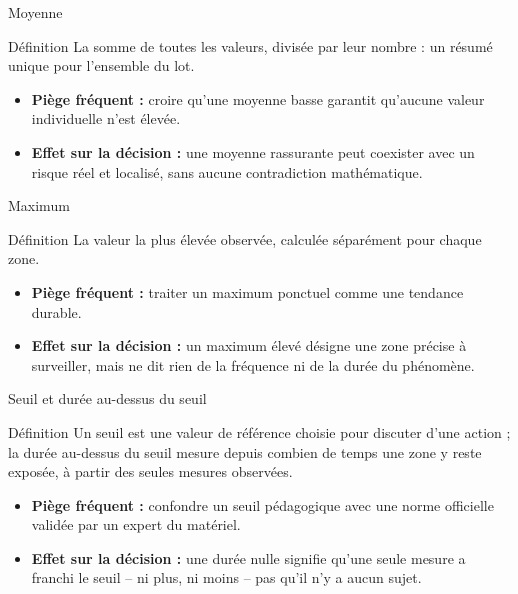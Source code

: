 \documentclass[aspectratio=169]{beamer}
\begin{document}
\begin{frame}{Moyenne}
  \begin{block}{Définition}
    La somme de toutes les valeurs, divisée par leur nombre : un résumé unique pour l'ensemble du lot.
  \end{block}
  \begin{itemize}
    \item \textbf{Piège fréquent :} croire qu'une moyenne basse garantit qu'aucune valeur individuelle n'est élevée.
    \item \textbf{Effet sur la décision :} une moyenne rassurante peut coexister avec un risque réel et localisé, sans aucune contradiction mathématique.
  \end{itemize}
\end{frame}

\begin{frame}{Maximum}
  \begin{block}{Définition}
    La valeur la plus élevée observée, calculée séparément pour chaque zone.
  \end{block}
  \begin{itemize}
    \item \textbf{Piège fréquent :} traiter un maximum ponctuel comme une tendance durable.
    \item \textbf{Effet sur la décision :} un maximum élevé désigne une zone précise à surveiller, mais ne dit rien de la fréquence ni de la durée du phénomène.
  \end{itemize}
\end{frame}

\begin{frame}{Seuil et durée au-dessus du seuil}
  \begin{block}{Définition}
    Un seuil est une valeur de référence choisie pour discuter d'une action ; la durée au-dessus du seuil mesure depuis combien de temps une zone y reste exposée, à partir des seules mesures observées.
  \end{block}
  \begin{itemize}
    \item \textbf{Piège fréquent :} confondre un seuil pédagogique avec une norme officielle validée par un expert du matériel.
    \item \textbf{Effet sur la décision :} une durée nulle signifie qu'une seule mesure a franchi le seuil -- ni plus, ni moins -- pas qu'il n'y a aucun sujet.
  \end{itemize}
\end{frame}
\end{document}
